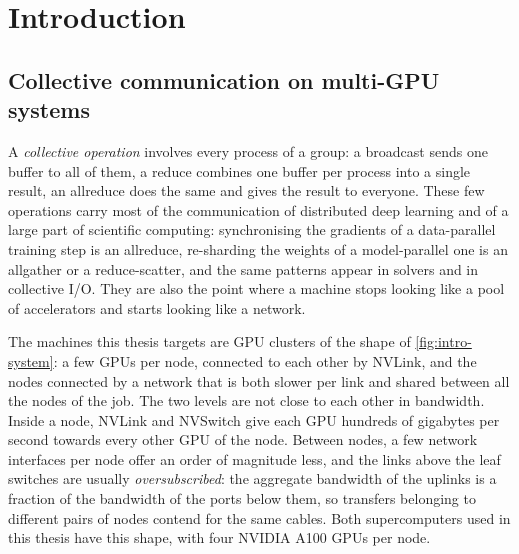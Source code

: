 \chapter{Introduction}\label{ch:intro}

\section{Collective communication on multi-GPU systems}\label{sec:intro-motivation}

A \emph{collective operation} involves every process of a group: a broadcast sends one buffer to all of them, a reduce combines one buffer per process into a single result, an allreduce does the same and gives the result to everyone.
These few operations carry most of the communication of distributed deep learning and of a large part of scientific computing: synchronising the gradients of a data-parallel training step is an allreduce, re-sharding the weights of a model-parallel one is an allgather or a reduce-scatter, and the same patterns appear in solvers and in collective I/O.
They are also the point where a machine stops looking like a pool of accelerators and starts looking like a network.

The machines this thesis targets are GPU clusters of the shape of \cref{fig:intro-system}: a few GPUs per node, connected to each other by NVLink, and the nodes connected by a network that is both slower per link and shared between all the nodes of the job.
The two levels are not close to each other in bandwidth.
Inside a node, NVLink and NVSwitch give each GPU hundreds of gigabytes per second towards every other GPU of the node.
Between nodes, a few network interfaces per node offer an order of magnitude less, and the links above the leaf switches are usually \emph{oversubscribed}: the aggregate bandwidth of the uplinks is a fraction of the bandwidth of the ports below them, so transfers belonging to different pairs of nodes contend for the same cables.
Both supercomputers used in this thesis have this shape, with four NVIDIA A100 GPUs per node.

